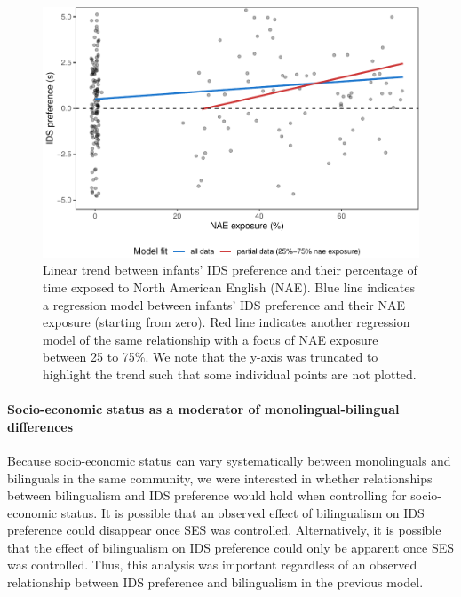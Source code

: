 \documentclass[,man,floatsintext]{apa6}
\let\oldparagraph\paragraph
\renewcommand{\paragraph}[1]{\oldparagraph{#1}\mbox{}}
\begin{document}
\begin{figure}
\centering
\includegraphics{mb1b-paper_files/figure-latex/fig2-1.pdf}
\caption{\label{fig:fig2}Linear trend between infants' IDS preference and their percentage of time exposed to North American English (NAE). Blue line indicates a regression model between infants' IDS preference and their NAE exposure (starting from zero). Red line indicates another regression model of the same relationship with a focus of NAE exposure between 25 to 75\%. We note that the y-axis was truncated to highlight the trend such that some individual points are not plotted.}
\end{figure}

\hypertarget{socio-economic-status-as-a-moderator-of-monolingual-bilingual-differences}{%
\paragraph{Socio-economic status as a moderator of monolingual-bilingual differences}\label{socio-economic-status-as-a-moderator-of-monolingual-bilingual-differences}}

Because socio-economic status can vary systematically between monolinguals and bilinguals in the same community, we were interested in whether relationships between bilingualism and IDS preference would hold when controlling for socio-economic status. It is possible that an observed effect of bilingualism on IDS preference could disappear once SES was controlled. Alternatively, it is possible that the effect of bilingualism on IDS preference could only be apparent once SES was controlled. Thus, this analysis was important regardless of an observed relationship between IDS preference and bilingualism in the previous model.
\end{document}
